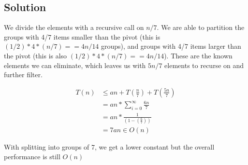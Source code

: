 \subsection*{Solution}

We divide the elements with a recursive call on $n/7$. We are able to partition the groups with 4/7 items smaller than the pivot (this is $(1/2)*4*(n/7) == 4n/14$ groups), and groups with 4/7 items larger than the pivot (this is also $(1/2)*4*(n/7) == 4n/14$). These are the known elements we can eliminate, which leaves us with $5n/7$ elements to recurse on and further filter. 

\begin{align*}
T(n) &\leq an + T(\frac{n}{7}) + T(\frac{5n}{7}) \\
     &= an * \sum_{i=0}^{\infty} \frac{6n}{7} \\
     &= an * \frac{1}{(1 - (\frac{6}{7}))} \\
     &= 7an \in O(n)
\end{align*}

With splitting into groups of 7, we get a lower constant but the overall performance is still $O(n)$
